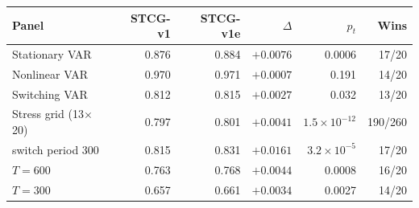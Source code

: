\begin{tabular}{lrrrrr}
\toprule
Panel & STCG-v1 & STCG-v1e & $\Delta$ & $p_t$ & Wins \\
\midrule
Stationary VAR & 0.876 & 0.884 & $+0.0076$ & 0.0006 & 17/20 \\
Nonlinear VAR & 0.970 & 0.971 & $+0.0007$ & 0.191 & 14/20 \\
Switching VAR & 0.812 & 0.815 & $+0.0027$ & 0.032 & 13/20 \\
Stress grid (13$\times$20) & 0.797 & 0.801 & $+0.0041$ & $1.5\times10^{-12}$ & 190/260 \\
\quad switch period 300 & 0.815 & 0.831 & $+0.0161$ & $3.2\times10^{-5}$ & 17/20 \\
\quad $T{=}600$ & 0.763 & 0.768 & $+0.0044$ & 0.0008 & 16/20 \\
\quad $T{=}300$ & 0.657 & 0.661 & $+0.0034$ & 0.0027 & 14/20 \\
\bottomrule
\end{tabular}

